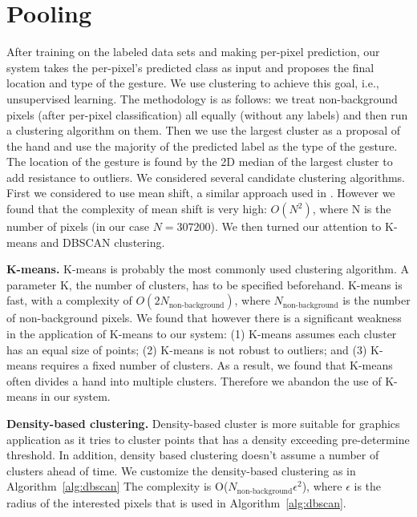 \section{Pooling}
\label{sec: pooling}
\cutsection

After training on the labeled data sets and making per-pixel prediction, our system takes the per-pixel's predicted class as input and proposes the final location and type of the gesture. We use clustering to achieve this goal, i.e., unsupervised learning. The methodology is as follows: we treat non-background pixels (after per-pixel classification) all equally (without any labels) and then run a clustering algorithm on them. Then we use the largest cluster as a proposal of the hand and use the majority of the predicted label as the type of the gesture. The location of the gesture is found by the 2D median of the largest cluster to add resistance to outliers. We considered several candidate clustering algorithms. First we considered to use mean shift, a similar approach used in \cite{shotton2011}. However we found that the complexity of mean shift is very high: $O(N^2)$, where N is the number of pixels (in our case $N= 307200$). We then turned our attention to K-means and DBSCAN clustering.

\textbf{K-means.} K-means is probably the most commonly used clustering algorithm. A parameter K, the number of clusters, has to be specified beforehand. K-means is fast, with a complexity of $O(2N_{\text{non-background}})$, where $N_{\text{non-background}}$ is the number of non-background pixels. We found that however there is a significant weakness in the application of K-means to our system: (1) K-means assumes each cluster has an equal size of points; (2) K-means is not robust to outliers; and (3) K-means requires a fixed number of clusters. As a result, we found that K-means often divides a hand into multiple clusters. Therefore we abandon the use of K-means in our system.

\textbf{Density-based clustering.} Density-based cluster is more suitable for graphics application as it tries to cluster points that has a density exceeding pre-determine threshold. In addition, density based clustering doesn't assume a number of clusters ahead of time. We customize the density-based clustering as in Algorithm~\ref{alg:dbscan} The complexity is O($N_{\text{non-background} }\epsilon^2$), where $\epsilon$ is the radius of the interested pixels that is used in Algorithm~\ref{alg:dbscan}.

